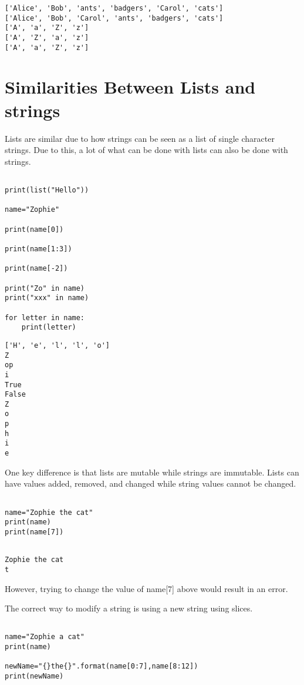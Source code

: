 \documentclass[11pt]{article}
\begin{document}
\begin{verbatim}
['Alice', 'Bob', 'ants', 'badgers', 'Carol', 'cats']
['Alice', 'Bob', 'Carol', 'ants', 'badgers', 'cats']
['A', 'a', 'Z', 'z']
['A', 'Z', 'a', 'z']
['A', 'a', 'Z', 'z']
\end{verbatim}

\section{Similarities Between Lists and strings}
\label{sec:org5ae0b87}

Lists are similar due to how strings can be seen as a list of single character strings. Due to this, a lot of what can be done with lists can also be done with strings.


\begin{verbatim}

print(list("Hello"))

name="Zophie"

print(name[0])

print(name[1:3])

print(name[-2])

print("Zo" in name)
print("xxx" in name)

for letter in name:
    print(letter)

\end{verbatim}

\begin{verbatim}
['H', 'e', 'l', 'l', 'o']
Z
op
i
True
False
Z
o
p
h
i
e
\end{verbatim}

One key difference is that lists are mutable while strings are immutable. Lists can have values added, removed, and changed while string values cannot be changed.


\begin{verbatim}

name="Zophie the cat"
print(name)
print(name[7])


\end{verbatim}

\begin{verbatim}
Zophie the cat
t
\end{verbatim}


However, trying to change the value of name[7] above would result in an error.

The correct way to modify a string is using a new string using slices.


\begin{verbatim}

name="Zophie a cat"
print(name)

newName="{}the{}".format(name[0:7],name[8:12])
print(newName)
\end{verbatim}
\end{document}
